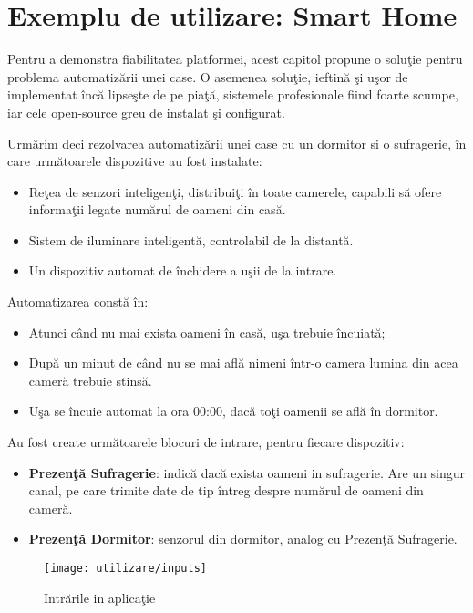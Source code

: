 \chapter{Exemplu de utilizare: Smart Home}
\label{chapter:studiuCaz}

Pentru a demonstra fiabilitatea platformei, acest capitol propune o soluţie pentru problema automatizării unei case. O asemenea soluţie, ieftină şi uşor de implementat încă lipseşte de pe piaţă, sistemele profesionale fiind foarte scumpe, iar cele open-source greu de instalat şi configurat.

Urmărim deci rezolvarea automatizării unei case cu un dormitor si o sufragerie, în care următoarele dispozitive au fost instalate:
\begin{itemize}
	\item Reţea de senzori inteligenţi, distribuiţi în toate camerele, capabili să ofere informaţii legate numărul de oameni din casă.
	\item Sistem de iluminare inteligentă, controlabil de la distantă.
	\item Un dispozitiv automat de închidere a uşii de la intrare.
\end{itemize}
Automatizarea constă în:
\begin{itemize}
	\item Atunci când nu mai exista oameni în casă, uşa trebuie încuiată;
	\item După un minut de când nu se mai află nimeni într-o camera lumina din acea cameră trebuie stinsă.
	\item Uşa se încuie automat la ora 00:00, dacă toţi oamenii se află în dormitor.
\end{itemize}

Au fost create următoarele blocuri de intrare, pentru fiecare dispozitiv:
\begin{itemize}
	\item \textbf{Prezenţă Sufragerie}: indică dacă exista oameni in sufragerie. Are un singur canal, pe care trimite date de tip întreg despre numărul de oameni din cameră.
	\item \textbf{Prezenţă Dormitor}: senzorul din dormitor, analog cu Prezenţă Sufragerie.
\end{itemize}
\begin{figure}[H]
	\centering
	\texttt{[image: utilizare/inputs]}
	\captionsetup{justification=centering}
	\caption{Intrările in aplicaţie}
	\label{fig:inputs}
\end{figure}

